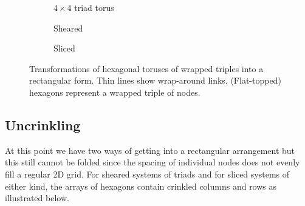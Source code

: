 			\begin{figure}
				
				
				
				\begin{subfigure}[b]{0.32\linewidth}
					\center
					
					\caption{$4 \times 4$ triad torus}
					\label{fig:hexToPlaneNative}
				\end{subfigure}
				\begin{subfigure}[b]{0.32\linewidth}
					\center
					
					\caption{Sheared}
					\label{fig:hexToPlaneShear}
				\end{subfigure}
				\begin{subfigure}[b]{0.32\linewidth}
					\center
					
					\caption{Sliced}
					\label{fig:hexToPlaneSlice}
				\end{subfigure}
				
				\caption{Transformations of hexagonal toruses of wrapped triples into a
				rectangular form.  Thin lines show wrap-around links. (Flat-topped)
				hexagons represent a wrapped triple of nodes.}
				\label{fig:hexToPlane}
			\end{figure}
			
		\subsection{Uncrinkling}
			
			At this point we have two ways of getting into a rectangular arrangement
			but this still cannot be folded since the spacing of individual nodes
			does not evenly fill a regular 2D grid. For sheared systems of triads and
			for sliced systems of either kind, the arrays of hexagons contain
			crinkled columns and rows as illustrated below.
			
